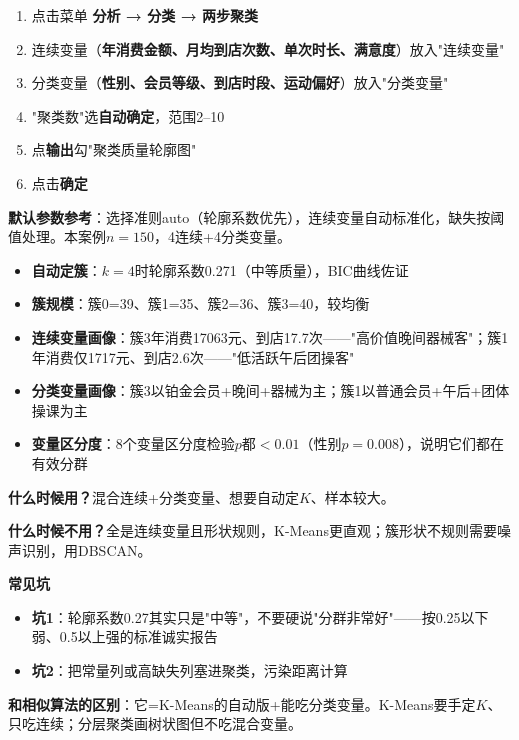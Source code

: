 \begin{algosposs}
\begin{enumerate}
    \item 点击菜单 \textbf{分析 → 分类 → 两步聚类}
    \item 连续变量（\textbf{年消费金额、月均到店次数、单次时长、满意度}）放入"连续变量"
    \item 分类变量（\textbf{性别、会员等级、到店时段、运动偏好}）放入"分类变量"
    \item "聚类数"选\textbf{自动确定}，范围2--10
    \item 点\textbf{输出}勾"聚类质量轮廓图"
    \item 点击\textbf{确定}
\end{enumerate}

\textbf{默认参数参考}：选择准则auto（轮廓系数优先），连续变量自动标准化，缺失按阈值处理。本案例$n=150$，4连续+4分类变量。
\end{algosposs}

\begin{algoresult}
\begin{itemize}
    \item \textbf{自动定簇}：$k=4$时轮廓系数0.271（中等质量），BIC曲线佐证
    \item \textbf{簇规模}：簇0=39、簇1=35、簇2=36、簇3=40，较均衡
    \item \textbf{连续变量画像}：簇3年消费17063元、到店17.7次——"高价值晚间器械客"；簇1年消费仅1717元、到店2.6次——"低活跃午后团操客"
    \item \textbf{分类变量画像}：簇3以铂金会员+晚间+器械为主；簇1以普通会员+午后+团体操课为主
    \item \textbf{变量区分度}：8个变量区分度检验$p$都$<0.01$（性别$p=0.008$），说明它们都在有效分群
\end{itemize}
\end{algoresult}

\begin{algonotes}
\textbf{什么时候用？}混合连续+分类变量、想要自动定$K$、样本较大。

\textbf{什么时候不用？}全是连续变量且形状规则，K-Means更直观；簇形状不规则需要噪声识别，用DBSCAN。

\textbf{常见坑}
\begin{itemize}
    \item \textbf{坑1}：轮廓系数0.27其实只是"中等"，不要硬说"分群非常好"——按0.25以下弱、0.5以上强的标准诚实报告
    \item \textbf{坑2}：把常量列或高缺失列塞进聚类，污染距离计算
\end{itemize}

\textbf{和相似算法的区别}：它=K-Means的自动版+能吃分类变量。K-Means要手定$K$、只吃连续；分层聚类画树状图但不吃混合变量。
\end{algonotes}


